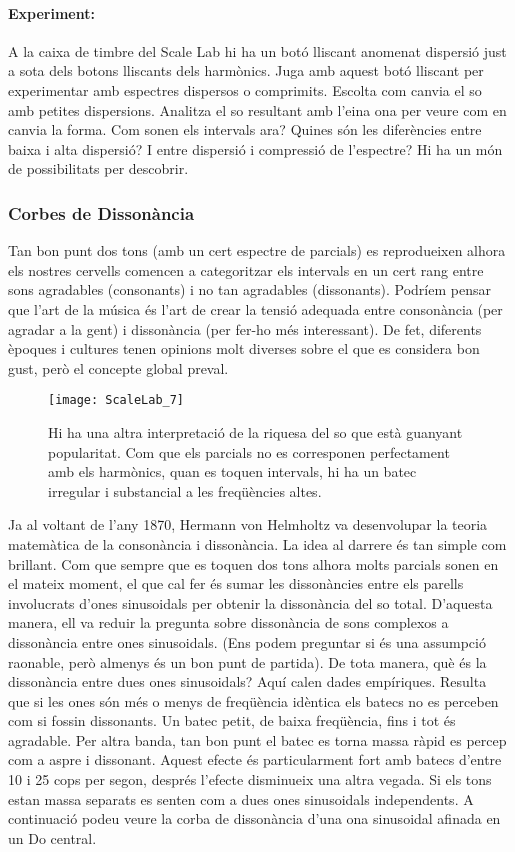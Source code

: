 \paragraph{Experiment:}
A la caixa de timbre del Scale Lab hi ha un botó lliscant anomenat dispersió just a sota dels botons lliscants dels harmònics. Juga amb aquest botó lliscant per experimentar amb espectres dispersos o comprimits. Escolta com canvia el so amb petites dispersions. Analitza el so resultant amb l'eina ona per veure com en canvia la forma. Com sonen els intervals ara? Quines són les diferències entre baixa i alta dispersió? I entre dispersió i compressió de l'espectre? Hi ha un món de possibilitats per descobrir.

\subsubsection{Corbes de Dissonància}
Tan bon punt dos tons (amb un cert espectre de parcials) es reprodueixen alhora els nostres cervells comencen a categoritzar els intervals en un cert rang entre sons agradables (consonants) i no tan agradables (dissonants). Podríem pensar que l'art de la música és l'art de crear la tensió adequada entre consonància (per agradar a la gent) i dissonància (per fer-ho més interessant). De fet, diferents èpoques i cultures tenen opinions molt diverses sobre el que es considera bon gust, però el concepte global preval.

\begin{figure}[h]
\centering
\texttt{[image: ScaleLab\_7]}
\caption*{Hi ha una altra interpretació de la riquesa del so que està guanyant popularitat. Com que els parcials no es corresponen perfectament amb els harmònics, quan es toquen intervals, hi ha un batec irregular i substancial a les freqüències altes.}
\end{figure}

Ja al voltant de l'any 1870, Hermann von Helmholtz va desenvolupar la teoria matemàtica de la consonància i dissonància. La idea al darrere és tan simple com brillant. Com que sempre que es toquen dos tons alhora molts parcials sonen en el mateix moment, el que cal fer és sumar les dissonàncies entre els parells involucrats d'ones sinusoidals per obtenir la dissonància del so total. D'aquesta manera, ell va reduir la pregunta sobre dissonància de sons complexos a dissonància entre ones sinusoidals. (Ens podem preguntar si és una assumpció raonable, però almenys és un bon punt de partida). De tota manera, què és la dissonància entre dues ones sinusoidals? Aquí calen dades empíriques. Resulta que si les ones són més o menys de freqüència idèntica els batecs no es perceben com si fossin dissonants. Un batec petit, de baixa freqüència, fins i tot és agradable. Per altra banda, tan bon punt el batec es torna massa ràpid es percep com a aspre i dissonant. Aquest efecte és particularment fort amb batecs d'entre 10 i 25 cops per segon, després l'efecte disminueix una altra vegada. Si els tons estan massa separats es senten com a dues ones sinusoidals independents. A continuació podeu veure la corba de dissonància d'una ona sinusoidal afinada en un Do central.

